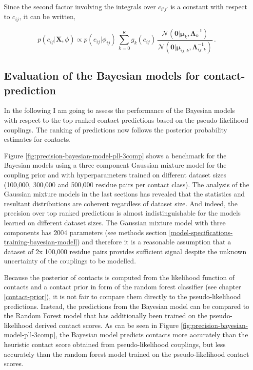 \documentclass[11pt,a4paper,twoside]{book}
\newcommand{\Gauss}{\mathcal{N}}
\newcommand{\Lijk}{\mathbf{\Lambda}_{ij,k}}
\newcommand{\Lk}{\mathbf{\Lambda}_k}
\newcommand{\muijk}{\mathbf{\mu}_{ij,k}}
\newcommand{\muk}{\mathbf{\mu}_k}
\newcommand{\cij}{c_{ij}}
\newcommand{\X}{\mathbf{X}}
\theoremstyle{definition}
\theoremstyle{definition}
\theoremstyle{remark}
\begin{document}
Since the second factor involving the integrals over \(c_{i'j'}\) is a
constant with respect to \(\cij\), it can be written,

\begin{equation}
    p(\cij | \X, \phi) \propto  p(\cij |\phi_{ij}) \,  \sum_{k=0}^K g_{k}(\cij) \, \frac{\Gauss( \mathbf{0} | \muk, \Lk^{-1})}{\Gauss(\mathbf{0} | \muijk, \Lijk^{-1})}  \, .
\label{eq:posterior-marginal-rij}
\end{equation}

\subsection{Evaluation of the Bayesian models for
contact-prediction}\label{evaluation-of-the-bayesian-models-for-contact-prediction}

In the following I am going to assess the performance of the Bayesian
models with respect to the top ranked contact predictions based on the
pseudo-likelihood couplings. The ranking of predictions now follows the
posterior probability estimates for contacts.

Figure \ref{fig:precision-bayesian-model-pll-3comp} shows a benchmark
for the Bayesian models using a three component Gaussian mixture model
for the coupling prior and with hyperparameters trained on different
dataset sizes (100,000, 300,000 and 500,000 residue pairs per contact
class). The analysis of the Gaussian mixture models in the last sections
has revealed that the statistics and resultant distributions are
coherent regardless of dataset size. And indeed, the precision over top
ranked predictions is almost indistinguishable for the models learned on
different dataset sizes. The Gaussian mixture model with three
components has 2004 parameters (see methods section
\ref{model-specifications-training-bayesian-model}) and therefore it is
a reasonable assumption that a dataset of 2x 100,000 residue pairs
provides sufficient signal despite the unknown uncertainty of the
couplings to be modelled.

Because the posterior of contacts is computed from the likelihood
function of contacts and a contact prior in form of the random forest
classifier (see chapter \ref{contact-prior}), it is not fair to compare
them directly to the pseudo-likelihood predictions. Instead, the
predictions from the Bayesian model can be compared to the Random Forest
model that has additionally been trained on the pseudo-likelihood
derived contact scores. As can be seen in Figure
\ref{fig:precision-bayesian-model-pll-3comp}, the Bayesian model
predicts contacts more accurately than the heuristic contact score
obtained from pseudo-likelihood couplings, but less accurately than the
random forest model trained on the pseudo-likelihood contact scores.
\end{document}
